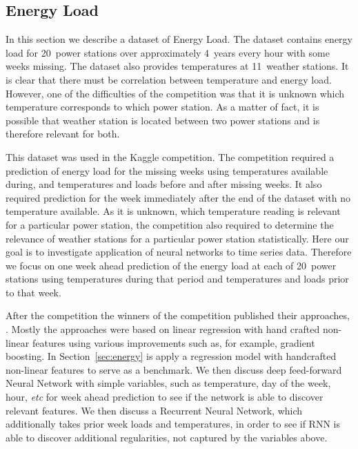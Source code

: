 \documentclass{article} %
\begin{document}
\subsection{Energy Load}
\label{sec:data/energy}

In this section we describe a dataset of Energy Load.
The dataset contains energy load for 20~power stations over approximately 4~years
every hour with some weeks missing. 
The dataset also provides temperatures at 11~weather stations. It is clear that
there must be correlation between temperature and energy load.
However, one of the difficulties of the competition was that it is unknown
which temperature corresponds to which power station. As a matter of fact, 
it is possible that weather station is located between two power stations
and is therefore relevant for both. 

This dataset was used in the Kaggle competition. 
The competition required a prediction of energy load for the missing weeks
using temperatures available during, and 
temperatures and loads before and after missing weeks. It also required 
prediction for the week immediately after the end of the dataset
with no temperature available. 
As it is unknown, which temperature reading is relevant for a particular
power station, the competition also required to
determine the relevance of weather stations for a particular power station
statistically.
Here our goal is to investigate application of neural networks to time series data.
Therefore we focus on one week ahead prediction of the energy load 
at each of 20~power stations
using temperatures during that period and temperatures and loads prior to 
that week.

After the competition
the winners of the competition published their approaches, 
\cite{energy_kaggle}.
Mostly the approaches were based on linear regression with 
hand crafted non-linear features using various improvements
such as, for example, gradient boosting.
In Section~\ref{sec:energy} is apply a regression model with 
handcrafted non-linear features to serve as a benchmark.
We then discuss deep feed-forward Neural Network with simple
variables, such as temperature, day of the week, hour, {\it etc}
for week ahead prediction to see if the network is able to discover
relevant features. 
We then discuss a Recurrent Neural Network, which additionally takes
prior week loads and temperatures, in order to see if RNN is able to 
discover additional regularities, not captured by the variables above.
\end{document}
